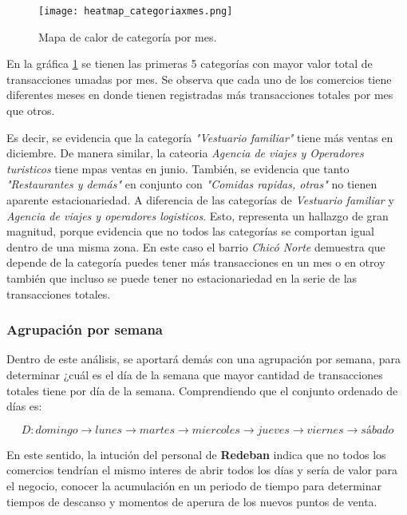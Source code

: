 \documentclass[a4paper]{article}
\begin{document}
\begin{figure}[h]
    \centering
	\texttt{[image: heatmap\_categoriaxmes.png]}
    \caption{Mapa de calor de categoría por mes.}
    \label{fig:heatmap_categoriaxmes}
\end{figure}

En la gráfica \ref{fig:heatmap_categoriaxmes} se tienen las primeras 5 categorías con mayor valor total de transacciones umadas por mes. Se observa que cada uno de los comercios tiene diferentes meses en donde tienen registradas más transacciones totales por mes que otros. 

Es decir, se evidencia que la categoría \textit{"Vestuario familiar"} tiene más ventas en diciembre. De manera similar, la cateoria \textit{Agencia de viajes y Operadores turisticos} tiene mpas ventas en junio. También, se evidencia que tanto \textit{"Restaurantes y demás"} en conjunto con \textit{"Comidas rapidas, otras"} no tienen aparente estacionariedad. A diferencia de las categorías de \textit{Vestuario familiar} y \textit{Agencia de viajes y operadores logisticos}. Esto, representa un hallazgo de gran magnitud, porque evidencia que no todos las categorías se comportan igual dentro de una misma zona. En este caso el barrio \textit{Chicó Norte} demuestra que depende de la categoría puedes tener más transacciones en un mes o en otroy también que incluso se puede tener no estacionariedad en la serie de las transacciones totales.


\subsubsection*{Agrupación por semana}

Dentro de este análisis, se aportará demás con una agrupación por semana, para determinar ¿cuál es el día de la semana que mayor cantidad de transacciones totales tiene por día de la semana. Comprendiendo que el conjunto ordenado de días es:

\begin{equation}
D: domingo \rightarrow lunes \rightarrow martes \rightarrow miercoles \rightarrow jueves \rightarrow viernes \rightarrow sábado
\end{equation}


En este sentido, la intución del personal de \textbf{Redeban} indica que no todos los comercios tendrían el mismo interes de abrir todos los días y sería de valor para el negocio, conocer la acumulación en un periodo de tiempo para determinar tiempos de descanso y momentos de aperura de los nuevos puntos de venta.
\end{document}
